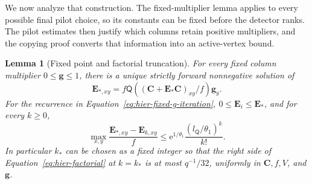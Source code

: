 \documentclass[11pt]{article}
\numberwithin{equation}{section}
\newtheorem{lemma}[theorem]{Lemma}
\theoremstyle{definition}
\theoremstyle{remark}
\begin{document}
We now analyze that construction. The fixed-multiplier lemma applies to every possible final pilot choice, so its constants can be fixed before the detector ranks. The pilot estimates then justify which columns retain positive multipliers, and the copying proof converts that information into an active-vertex bound.

\begin{lemma}[Fixed point and factorial truncation]
\label{lem:hier-fixed-point}
For every fixed column multiplier $0\leq {\mathbf{g}}\leq1$, there is a unique
strictly forward nonnegative solution of
\begin{equation}
 {\mathbf{E}}_{*,xy}=f{\mathsf{Q}}(({\mathbf{C}}+{\mathbf{E}}_*{\mathbf{C}})_{xy}/f){\mathbf{g}}_{y}.
 \label{eq:hier-fixed-point}
\end{equation}
For the recurrence in Equation~\eqref{eq:hier-fixed-g-iteration}, $0\leq {\mathbf{E}}_i\leq {\mathbf{E}}_*$, and for every $k\geq0$,
\begin{equation}
 \max_{x,y}\frac{{\mathbf{E}}_{*,xy}-{\mathbf{E}}_{k,xy}}f
 \leq
 {\mathrm e}^{1/\theta_1}\frac{({l}_{\mathsf{Q}}/\theta_1)^k}{k!}.
 \label{eq:hier-factorial}
\end{equation}
In particular $k_*$ can be chosen as a fixed integer so that the
right side of Equation~\eqref{eq:hier-factorial} at $k=k_*$ is at most
$q^{-1}/32$, uniformly in ${\mathbf{C}},f,V$, and ${\mathbf{g}}$.
\end{lemma}
\end{document}
